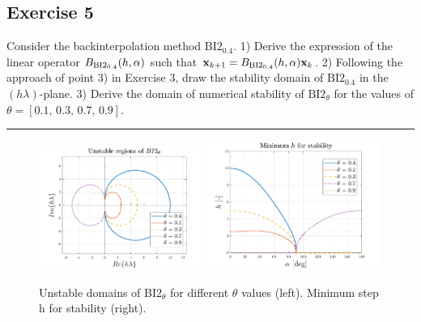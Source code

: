 \documentclass[11pt,a4paper,oneside]{article}
\renewcommand{\vec}[1]{\mathbf{#1}}
\begin{document}
\subsection*{Exercise 5}
Consider the backinterpolation method $\textrm{BI2}_{0.4}$. 1) Derive the expression of the 
linear operator $B_{\rm BI2_{0.4}}(h,\alpha)$ such that $\vec x_{k+1} = B_{\rm BI2_{0.4}}(h,\alpha) \vec x_k$. 2) 
Following the approach of point 3) in Exercise 3, draw the stability domain of 
$\textrm{BI2}_{0.4}$ in the $(h\lambda)$-plane. 3) Derive the domain of numerical stability 
of $\textrm{BI2}_{\theta}$ for the values of $\theta = [0.1,\, 0.3,\, 0.7,\, 0.9]$.

\medskip \hrule \medskip

\begin{figure}[h]
    \centering
    \includegraphics[width=0.48\textwidth]{gfx/ex5_1.pdf}
    \includegraphics[width=0.50\textwidth]{gfx/ex5_2.pdf}
    \caption{Unstable domains of BI2$_{\theta}$ for different $\theta$ values (left). Minimum step h for stability (right).}
    \label{fig:ex5_sol}
\end{figure}
\end{document}
